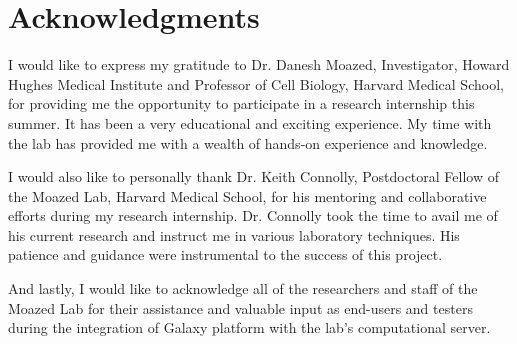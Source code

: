 \documentclass[a4paper,10pt]{article}
\begin{document}
\section{Acknowledgments}
I would like to express my gratitude to Dr. Danesh Moazed, Investigator, Howard Hughes Medical Institute and Professor of Cell Biology, Harvard Medical School, for providing me the opportunity to participate in a research internship this summer.  It has been a very educational and exciting experience.  My time with the lab has provided me with a wealth of hands-on experience and knowledge.

I would also like to personally thank Dr. Keith Connolly, Postdoctoral Fellow of the Moazed Lab, Harvard Medical School, for his mentoring and collaborative efforts during my research internship.  Dr. Connolly took the time to avail me of his current research and instruct me in various laboratory techniques.  His patience and guidance were instrumental to the success of this project.

And lastly, I would like to acknowledge all of the researchers and staff of the Moazed Lab for their assistance and valuable input as end-users and testers during the integration of Galaxy platform with the lab's computational server.
\end{document}
